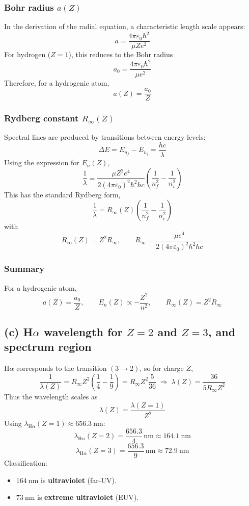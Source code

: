\documentclass{article}
\begin{document}
\subsubsection*{Bohr radius $a(Z)$}

In the derivation of the radial equation, a characteristic length scale appears:
\[
a = \frac{4\pi\varepsilon_0 \hbar^2}{\mu Z e^2}
\]
For hydrogen ($Z=1$), this reduces to the Bohr radius
\[
a_0 = \frac{4\pi\varepsilon_0 \hbar^2}{\mu e^2}
\]
Therefore, for a hydrogenic atom,
\[
a(Z) = \frac{a_0}{Z}
\]

\subsubsection*{Rydberg constant $R_\infty(Z)$}

Spectral lines are produced by transitions between energy levels:
\[
\Delta E = E_{n_f} - E_{n_i} = \frac{hc}{\lambda}
\]
Using the expression for $E_n(Z)$,
\[
\frac{1}{\lambda}
=
\frac{\mu Z^2 e^4}{2(4\pi\varepsilon_0)^2 \hbar^2 hc}
\left(\frac{1}{n_f^2} - \frac{1}{n_i^2}\right)
\]
This has the standard Rydberg form,
\[
\frac{1}{\lambda} = R_\infty(Z)
\left(\frac{1}{n_f^2} - \frac{1}{n_i^2}\right)
\]
with
\[
R_\infty(Z) = Z^2 R_\infty,
\qquad
R_\infty = \frac{\mu e^4}{2(4\pi\varepsilon_0)^2 \hbar^2 hc}
\]

\subsubsection*{Summary}

For a hydrogenic atom,
\[
a(Z) = \frac{a_0}{Z}, \qquad
E_n(Z) \propto -\frac{Z^2}{n^2}, \qquad
R_\infty(Z) = Z^2 R_\infty
\]

\subsection*{(c) H$\alpha$ wavelength for $Z=2$ and $Z=3$, and spectrum region}

H$\alpha$ corresponds to the transition $(3\to 2)$, so for charge $Z$,
\[
\frac{1}{\lambda(Z)} = R_\infty Z^2\left(\frac{1}{4}-\frac{1}{9}\right)
=R_\infty Z^2\frac{5}{36}
\;\Rightarrow\;
\lambda(Z)=\frac{36}{5R_\infty Z^2}
\]
Thus the wavelength scales as
\[
\lambda(Z)=\frac{\lambda(Z=1)}{Z^2}
\]
Using $\lambda_{\mathrm{H}\alpha}(Z=1)\approx 656.3~\mathrm{nm}$:
\[
\boxed{\;\lambda_{\mathrm{H}\alpha}(Z=2)=\frac{656.3}{4}\,\mathrm{nm}\approx 164.1~\mathrm{nm}\;}
\]
\[
\boxed{\;\lambda_{\mathrm{H}\alpha}(Z=3)=\frac{656.3}{9}\,\mathrm{nm}\approx 72.9~\mathrm{nm}\;}
\]
Classification:
\begin{itemize}
\item $164~\mathrm{nm}$ is \textbf{ultraviolet} (far-UV).
\item $73~\mathrm{nm}$ is \textbf{extreme ultraviolet} (EUV).
\end{itemize}
\end{document}
